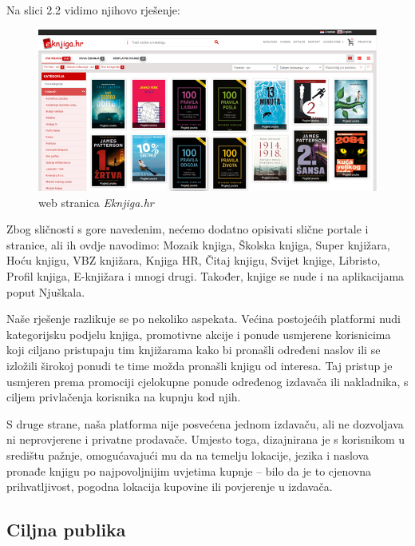 		Na slici 2.2 vidimo njihovo rješenje:
		
			\begin{figure}[H]
				\includegraphics[scale=1]{slike/Eknjiga.PNG} %
				\centering
				\caption{web stranica \textit{Eknjiga.hr}}
				\label{fig:Eknjiga}
			\end{figure}
		
		
		Zbog sličnosti s gore navedenim, nećemo dodatno opisivati slične portale i stranice, ali ih ovdje navodimo: Mozaik knjiga, Školska knjiga, Super knjižara, Hoću knjigu, VBZ knjižara, Knjiga HR, Čitaj knjigu, Svijet knjige, Libristo, Profil knjiga, E-knjižara i mnogi drugi. Također, knjige se nude i na aplikacijama poput Njuškala.
		
		Naše rješenje razlikuje se po nekoliko aspekata. Većina postojećih platformi nudi kategorijsku podjelu knjiga, promotivne akcije i ponude usmjerene korisnicima koji ciljano pristupaju tim knjižarama kako bi pronašli određeni naslov ili se izložili širokoj ponudi te time možda pronašli knjigu od interesa. Taj pristup je usmjeren prema promociji cjelokupne ponude određenog izdavača ili nakladnika, s ciljem privlačenja korisnika na kupnju kod njih. 
		
		S druge strane, naša platforma nije posvećena jednom izdavaču, ali ne dozvoljava ni neprovjerene i privatne prodavače. Umjesto toga, dizajnirana je s korisnikom u središtu pažnje, omogućavajući mu da na temelju lokacije, jezika i naslova pronađe knjigu po najpovoljnijim uvjetima kupnje – bilo da je to cjenovna prihvatljivost, pogodna lokacija kupovine ili povjerenje u izdavača.
		
		\subsection*{Ciljna publika}
		
